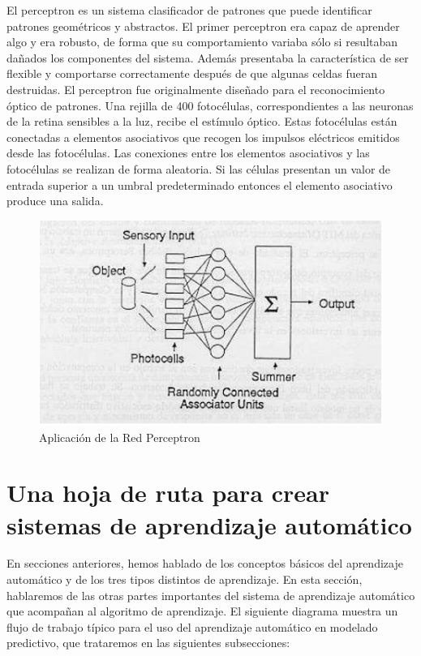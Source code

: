 \vspace{1\baselineskip}
El perceptron es un sistema clasificador de patrones que puede identificar patrones geométricos y abstractos. El primer perceptron era capaz de aprender algo y era robusto, de forma que su comportamiento variaba sólo si resultaban dañados los componentes del sistema. 
Además presentaba la característica de ser flexible y comportarse correctamente después de que algunas celdas fueran destruidas.
El perceptron fue originalmente diseñado para el reconocimiento óptico de patrones.
Una rejilla de 400 fotocélulas, correspondientes a las neuronas de la retina sensibles a la luz, recibe el estímulo óptico. Estas fotocélulas están conectadas a elementos asociativos que recogen los impulsos eléctricos emitidos desde las fotocélulas. Las
conexiones entre los elementos asociativos y las fotocélulas se realizan de forma aleatoria.
Si las células presentan un valor de entrada superior a un umbral predeterminado entonces el elemento asociativo produce una salida.

\begin{figure}[H]
  \begin{center}
    \includegraphics[scale=0.90]{./perceptron.png}
    \caption{Aplicación de la Red Perceptron}
    \label{fig:perceptron}
  \end{center}
\end{figure}

\section{Una hoja de ruta para crear sistemas
de aprendizaje automático}

En secciones anteriores, hemos hablado de los conceptos básicos del aprendizaje automático y de los tres tipos distintos de aprendizaje. En esta sección, hablaremos de las otras partes importantes del sistema de aprendizaje automático que acompañan al algoritmo de aprendizaje. El siguiente diagrama muestra un flujo de trabajo típico para el uso del aprendizaje automático en modelado predictivo, que trataremos en las siguientes subsecciones:

